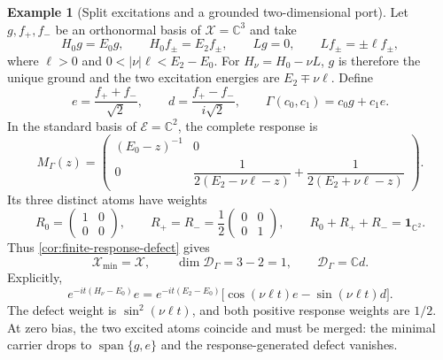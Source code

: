 \documentclass[11pt,reqno]{scrartcl}
\newcommand{\CC}{\mathbb C}
\newcommand{\idop}{\mathbf 1}
\DeclareMathOperator{\Span}{span}
\newcommand{\scrX}{\mathscr X}
\newcommand{\scrE}{\mathscr E}
\newcommand{\Hmin}{\mathscr X_{\min}}
\theoremstyle{plain}
\theoremstyle{definition}
\newtheorem{example}[example]{Example}
\theoremstyle{remark}
\begin{document}
\begin{example}[Split excitations and a grounded two-dimensional port]
\label{ex:split-excitation-response}
Let $g,f_+,f_-$ be an orthonormal basis of $\scrX=\CC^3$ and take
\begin{equation}
 H_0g=E_0g,\qquad H_0f_\pm=E_2f_\pm,
 \qquad Lg=0,\qquad Lf_\pm=\pm\ell f_\pm,
 \label{eq:three-state-data}
\end{equation}
where $\ell>0$ and $0<|\nu|\ell<E_2-E_0$.  For
$H_\nu=H_0-\nu L$, $g$ is therefore the unique ground and the two
excitation energies are $E_2\mp\nu\ell$.  Define
\begin{equation}
 e=\frac{f_++f_-}{\sqrt2},\qquad
 d=\frac{f_+-f_-}{i\sqrt2},\qquad
 \Gamma(c_0,c_1)=c_0g+c_1e.
 \label{eq:three-state-port}
\end{equation}
In the standard basis of $\scrE=\CC^2$, the complete response is
\begin{equation}
 M_\Gamma(z)=
 \begin{pmatrix}
 (E_0-z)^{-1}&0\\
 0&\dfrac{1}{2(E_2-\nu\ell-z)}
    +\dfrac{1}{2(E_2+\nu\ell-z)}
 \end{pmatrix}.
 \label{eq:three-state-response}
\end{equation}
Its three distinct atoms have weights
\begin{equation}
 R_0=\begin{pmatrix}1&0\\0&0\end{pmatrix},\qquad
 R_+=R_-=\frac12\begin{pmatrix}0&0\\0&1\end{pmatrix},
 \qquad R_0+R_++R_-=\idop_{\CC^2}.
 \label{eq:three-state-weights}
\end{equation}
Thus \cref{cor:finite-response-defect} gives
\begin{equation}
 \Hmin=\scrX,\qquad \dim\mathcal D_\Gamma=3-2=1,
 \qquad \mathcal D_\Gamma=\CC d.
 \label{eq:three-state-minimal-defect}
\end{equation}
Explicitly,
\begin{equation}
 e^{-it(H_\nu-E_0)}e
 =e^{-it(E_2-E_0)}
   \bigl[\cos(\nu\ell t)e-\sin(\nu\ell t)d\bigr].
 \label{eq:three-state-transfer}
\end{equation}
The defect weight is $\sin^2(\nu\ell t)$, and both positive response
weights are $1/2$.  At zero bias, the two excited atoms coincide and must
be merged: the minimal carrier drops to $\Span\{g,e\}$ and the
response-generated defect vanishes.
\end{example}
\end{document}
